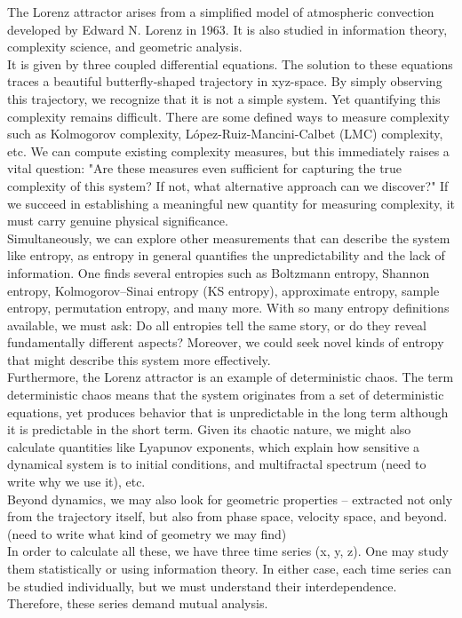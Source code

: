 \documentclass[%
 reprint,
 amsmath,amssymb,
 aps,
 floatfix,
]{revtex4-2}
\begin{document}
The Lorenz attractor arises from a simplified model of atmospheric convection developed by Edward N. Lorenz in 1963. It is also studied in information theory, complexity science, and geometric analysis.\\
It is given by three coupled differential equations. The solution to these equations traces a beautiful butterfly-shaped trajectory in xyz-space. By simply observing this trajectory, we recognize that it is not a simple system. Yet quantifying this complexity remains difficult. There are some defined ways to measure complexity such as Kolmogorov complexity, López-Ruiz-Mancini-Calbet (LMC) complexity, etc. 
We can compute existing complexity measures, but this immediately raises a vital question: "Are these measures even sufficient for capturing the true complexity of this system? If not, what alternative approach can we discover?"
If we succeed in establishing a meaningful new quantity for measuring complexity, it must carry genuine physical significance.\\
Simultaneously, we can explore other measurements that can describe the system like entropy, as entropy in general quantifies the unpredictability and the lack of information. One finds several entropies such as Boltzmann entropy, Shannon entropy, Kolmogorov–Sinai entropy (KS entropy), approximate entropy, sample entropy, permutation entropy, and many more. With so many entropy definitions available, we must ask: Do all entropies tell the same story, or do they reveal fundamentally different aspects? Moreover, we could seek novel kinds of entropy that might describe this system more effectively.\\
Furthermore, the Lorenz attractor is an example of deterministic chaos. The term deterministic chaos means that the system originates from a set of deterministic equations, yet produces behavior that is unpredictable in the long term although it is predictable in the short term. Given its chaotic nature, we might also calculate quantities like Lyapunov exponents, which explain how sensitive a dynamical system is to initial conditions, and multifractal spectrum (need to write why we use it), etc.\\
Beyond dynamics, we may also look for geometric properties – extracted not only from the trajectory itself, but also from phase space, velocity space, and beyond. (need to write what kind of geometry we may find)\\
In order to calculate all these, we have three time series (x, y, z). One may study them statistically or using information theory. In either case, each time series can be studied individually, but we must understand their interdependence. Therefore, these series demand mutual analysis.\\
\end{document}
